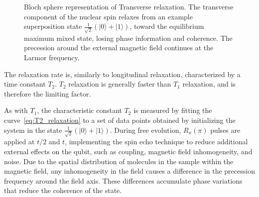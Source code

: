 \begin{figure}[ht]
\centering
{}
\label{fig:bloch_transverse}
\caption{Bloch sphere representation of Transverse relaxation. The transverse component of the nuclear spin relaxes from an example superposition state \(\frac{1}{\sqrt{2}}(|0\rangle + |1\rangle)\), toward the equilibrium maximum mixed state, losing phase information and coherence. The precession around the external magnetic field continues at the Larmor frequency.}
\end{figure}

The relaxation rate is, similarly to longitudinal relaxation, characterized by a time constant \(T_2\). \(T_2\) relaxation is generally faster than \(T_1\) relaxation, and is therefore the limiting factor.

As with \(T_1\), the characteristic constant \(T_2\) is measured by fitting the curve~\ref{eq:T2_relaxation} to a set of data points obtained by initializing the system in the state \(\frac{1}{\sqrt{2}}(\lvert0\rangle+\lvert1\rangle)\). During free evolution, \(R_x(\pi)\) pulses are applied at \(t/2\) and \(t\), implementing the spin echo technique to reduce additional external effects on the qubit, such as coupling, magnetic field inhomogeneity, and noise. Due to the spatial distribution of molecules in the sample within the magnetic field, any inhomogeneity in the field causes a difference in the precession frequency around the field axis. These differences accumulate phase variations that reduce the coherence of the state.

